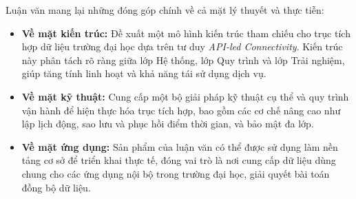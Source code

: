 Luận văn mang lại những đóng góp chính về cả mặt lý thuyết và thực tiễn:

\begin{itemize}
    \item \textbf{Về mặt kiến trúc:} Đề xuất một mô hình kiến trúc tham chiếu cho trục tích hợp dữ liệu trường đại học dựa trên tư duy \textit{API-led Connectivity}. Kiến trúc này phân tách rõ ràng giữa lớp Hệ thống, lớp Quy trình và lớp Trải nghiệm, giúp tăng tính linh hoạt và khả năng tái sử dụng dịch vụ.
    \item \textbf{Về mặt kỹ thuật:} Cung cấp một bộ giải pháp kỹ thuật cụ thể và quy trình vận hành để hiện thực hóa trục tích hợp, bao gồm các cơ chế nâng cao như lập lịch động, sao lưu và phục hồi điểm thời gian, và bảo mật đa lớp.
    \item \textbf{Về mặt ứng dụng:} Sản phẩm của luận văn có thể được sử dụng làm nền tảng cơ sở để triển khai thực tế, đóng vai trò là nơi cung cấp dữ liệu dùng chung cho các ứng dụng nội bộ trong trường đại học, giải quyết bài toán đồng bộ dữ liệu.
\end{itemize}